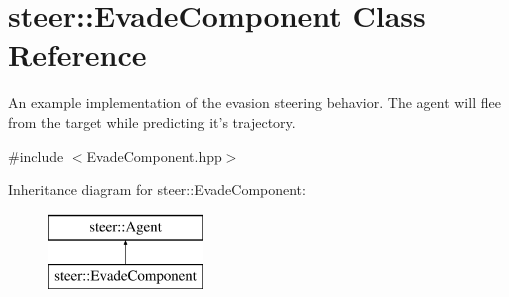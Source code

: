 \hypertarget{classsteer_1_1_evade_component}{\section{steer\-:\-:Evade\-Component Class Reference}
\label{classsteer_1_1_evade_component}
}


An example implementation of the evasion steering behavior. The agent will flee from the target while predicting it's trajectory.  




{\ttfamily \#include $<$Evade\-Component.\-hpp$>$}

Inheritance diagram for steer\-:\-:Evade\-Component\-:\begin{figure}[H]
\begin{center}
\leavevmode
\includegraphics[height=2.000000cm]{classsteer_1_1_evade_component}
\end{center}
\end{figure}
